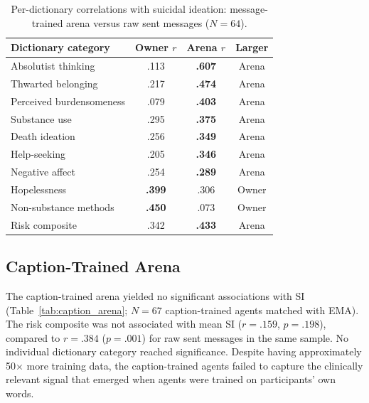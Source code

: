 \documentclass[review,12pt,authoryear]{elsarticle}
\begin{document}
\begin{table}[H]
\centering
\caption{Per-dictionary correlations with suicidal ideation: message-trained arena versus raw sent messages ($N = 64$).}
\label{tab:arena_vs_raw}
\small
\begin{tabular}{lccc}
\toprule
Dictionary category & Owner $r$ & Arena $r$ & Larger \\
\midrule
Absolutist thinking & .113 & \textbf{.607} & Arena \\
Thwarted belonging & .217 & \textbf{.474} & Arena \\
Perceived burdensomeness & .079 & \textbf{.403} & Arena \\
Substance use & .295 & \textbf{.375} & Arena \\
Death ideation & .256 & \textbf{.349} & Arena \\
Help-seeking & .205 & \textbf{.346} & Arena \\
Negative affect & .254 & \textbf{.289} & Arena \\
Hopelessness & \textbf{.399} & .306 & Owner \\
Non-substance methods & \textbf{.450} & .073 & Owner \\
\midrule
Risk composite & .342 & \textbf{.433} & Arena \\
\bottomrule
\end{tabular}
\end{table}

\subsection{Caption-Trained Arena}

The caption-trained arena yielded no significant associations with SI (Table~\ref{tab:caption_arena}; $N = 67$ caption-trained agents matched with EMA). The risk composite was not associated with mean SI ($r = .159$, $p = .198$), compared to $r = .384$ ($p = .001$) for raw sent messages in the same sample. No individual dictionary category reached significance. Despite having approximately 50$\times$ more training data, the caption-trained agents failed to capture the clinically relevant signal that emerged when agents were trained on participants' own words.
\end{document}
